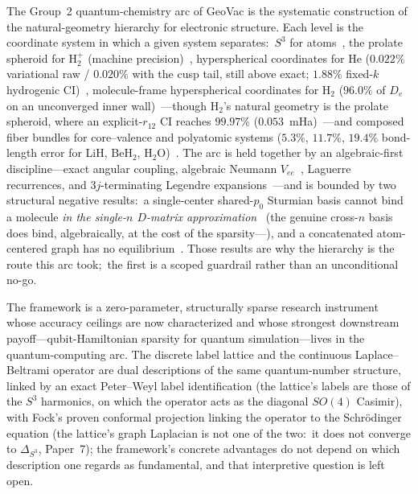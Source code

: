 \documentclass[aps,pra,twocolumn,superscriptaddress,longbibliography]{revtex4-2}
\newcommand{\gvc}[2]{#2}
\begin{document}
The Group~2 quantum-chemistry arc of GeoVac is the systematic
construction of the natural-geometry hierarchy for electronic
structure.  Each level is the coordinate system in which a given system
separates:\ $S^3$ for atoms~\cite{loutey_paper7}, the prolate spheroid
for $\mathrm{H}_2^+$ (machine precision)~\cite{loutey_paper11}, hyperspherical
coordinates for He (\gvc{he-bracket}{$0.022\%$ variational raw / $0.020\%$ with the
cusp tail, still above exact; $1.88\%$ fixed-$k$ hydrogenic CI})~\cite{loutey_paper13}, molecule-frame hyperspherical
coordinates for $\mathrm{H}_2$ ($96.0\%$ of $D_e$ on an unconverged inner
wall)~\cite{loutey_paper15}---though $\mathrm{H}_2$'s natural
geometry is the prolate spheroid, where an explicit-$r_{12}$ CI reaches
$99.97\%$ ($0.053$~mHa)~\cite{loutey_paper12}---and composed fiber bundles for
core--valence and polyatomic systems ($5.3\%$, $11.7\%$, $19.4\%$
bond-length error for LiH, $\mathrm{BeH}_2$,
$\mathrm{H}_2\mathrm{O}$)~\cite{loutey_paper17}.  The arc is held
together by an algebraic-first discipline---exact angular coupling,
algebraic Neumann $V_{ee}$~\cite{loutey_paper12}, Laguerre recurrences,
and $3j$-terminating Legendre expansions~\cite{loutey_paper15}---and is
bounded by two structural negative results:\ a single-center
shared-$p_0$ Sturmian basis cannot bind a molecule \emph{in the single-$n$
$D$-matrix approximation}~\cite{loutey_paper8} (the genuine cross-$n$
basis does bind, algebraically, at the cost of the
sparsity---\cite{loutey_paper60}), and a
concatenated atom-centered graph has no equilibrium~\cite{loutey_fci_mol}.
Those results are why the hierarchy is the route this arc took;\ the
first is a scoped guardrail rather than an unconditional no-go.

The framework is a zero-parameter, structurally sparse research
instrument whose accuracy ceilings are now characterized and whose
strongest downstream payoff---qubit-Hamiltonian sparsity for quantum
simulation---lives in the quantum-computing arc.  The discrete label lattice and the continuous Laplace--Beltrami
operator are dual descriptions of the same quantum-number structure,
linked by an exact Peter--Weyl label identification (the lattice's
labels are those of the $S^3$ harmonics, on which the operator acts as
the diagonal $SO(4)$ Casimir), with Fock's proven conformal projection
linking the operator to the Schr\"odinger equation (\gvc{graph-s3-wall}{the lattice's
graph Laplacian is not one of the two:\ it does not converge to
$\Delta_{S^3}$, Paper~7}); the framework's concrete
advantages do not depend on which description one regards as
fundamental, and that interpretive question is left open.
\end{document}
